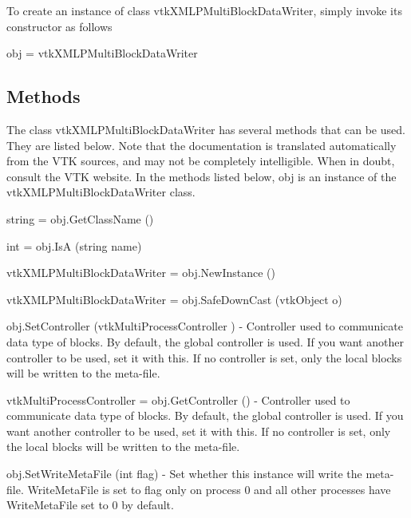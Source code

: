 To create an instance of class vtk\-X\-M\-L\-P\-Multi\-Block\-Data\-Writer, simply invoke its constructor as follows \begin{DoxyVerb}  obj = vtkXMLPMultiBlockDataWriter
\end{DoxyVerb}
 \hypertarget{vtkwidgets_vtkxyplotwidget_Methods}{}\subsection{Methods}\label{vtkwidgets_vtkxyplotwidget_Methods}
The class vtk\-X\-M\-L\-P\-Multi\-Block\-Data\-Writer has several methods that can be used. They are listed below. Note that the documentation is translated automatically from the V\-T\-K sources, and may not be completely intelligible. When in doubt, consult the V\-T\-K website. In the methods listed below, {\ttfamily obj} is an instance of the vtk\-X\-M\-L\-P\-Multi\-Block\-Data\-Writer class. 
\begin{DoxyItemize}
\item {\ttfamily string = obj.\-Get\-Class\-Name ()}  
\item {\ttfamily int = obj.\-Is\-A (string name)}  
\item {\ttfamily vtk\-X\-M\-L\-P\-Multi\-Block\-Data\-Writer = obj.\-New\-Instance ()}  
\item {\ttfamily vtk\-X\-M\-L\-P\-Multi\-Block\-Data\-Writer = obj.\-Safe\-Down\-Cast (vtk\-Object o)}  
\item {\ttfamily obj.\-Set\-Controller (vtk\-Multi\-Process\-Controller )} -\/ Controller used to communicate data type of blocks. By default, the global controller is used. If you want another controller to be used, set it with this. If no controller is set, only the local blocks will be written to the meta-\/file.  
\item {\ttfamily vtk\-Multi\-Process\-Controller = obj.\-Get\-Controller ()} -\/ Controller used to communicate data type of blocks. By default, the global controller is used. If you want another controller to be used, set it with this. If no controller is set, only the local blocks will be written to the meta-\/file.  
\item {\ttfamily obj.\-Set\-Write\-Meta\-File (int flag)} -\/ Set whether this instance will write the meta-\/file. Write\-Meta\-File is set to flag only on process 0 and all other processes have Write\-Meta\-File set to 0 by default.  
\end{DoxyItemize}
